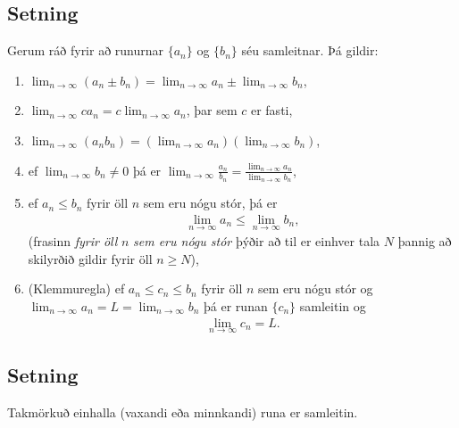 \documentclass[a4paper,10pt,icelandic]{sphinxmanual}
\begin{document}
\subsection{Setning}
\label{kafli09:id4}
Gerum ráð fyrir að runurnar \(\{a_n\}\) og \(\{b_n\}\) séu
samleitnar. Þá gildir:
\begin{enumerate}
\item {} 
\(\lim_{n\rightarrow\infty}(a_n\pm b_n)=
\lim_{n\rightarrow\infty}a_n\pm\lim_{n\rightarrow\infty}b_n\),

\item {} 
\(\lim_{n\rightarrow\infty}ca_n=
c\lim_{n\rightarrow\infty}a_n\), þar sem \(c\) er fasti,

\item {} 
\(\lim_{n\rightarrow\infty}(a_n b_n)=
(\lim_{n\rightarrow\infty}a_n)(\lim_{n\rightarrow\infty}b_n)\),

\item {} 
ef \(\lim_{n\rightarrow\infty}b_n\neq 0\) þá er
\(\lim_{n\rightarrow\infty}\frac{a_n}{b_n}=
\frac{\lim_{n\rightarrow\infty}a_n}{\lim_{n\rightarrow\infty}b_n}\),

\item {} 
ef \(a_n\leq b_n\) fyrir öll \(n\) sem eru nógu stór, þá
er
\begin{equation*}
\begin{split}\lim_{n\rightarrow\infty}a_n\leq\lim_{n\rightarrow\infty}b_n,\end{split}
\end{equation*}
(frasinn \emph{fyrir öll} \(n\) \emph{sem eru nógu stór} þýðir að til er
einhver tala \(N\) þannig að skilyrðið gildir fyrir öll
\(n\geq N\)),

\item {} 
(Klemmuregla) ef \(a_n\leq c_n\leq b_n\) fyrir öll \(n\)
sem eru nógu stór og
\(\lim_{n\rightarrow\infty}a_n=L=\lim_{n\rightarrow\infty}b_n\)
þá er runan \(\{c_n\}\) samleitin og
\begin{equation*}
\begin{split}\lim_{n\rightarrow\infty}c_n=L.\end{split}
\end{equation*}
\end{enumerate}


\subsection{Setning}
\label{kafli09:id5}
Takmörkuð einhalla (vaxandi eða minnkandi) runa er samleitin.
\end{document}
